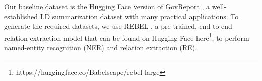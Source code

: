 Our baseline dataset is the Hugging Face version of GovReport \cite{huang2021efficient}, a well-established LD summarization dataset with many practical applications. To generate the required datasets, we use REBEL \cite{huguet2021rebel}, a pre-trained, end-to-end relation extraction model that can be found on Hugging Face here\footnote{https://huggingface.co/Babelscape/rebel-large}, to perform named-entity recognition (NER) and relation extraction (RE).